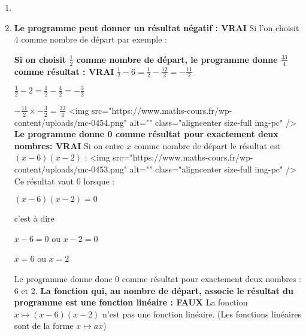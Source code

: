 \begin{corrige}
     \begin{enumerate}
          \item
\begin{center}
\end{center}
          \item
          \textbf{Le programme peut donner un résultat négatif : VRAI}
          Si l'on choisit 4 comme nombre de départ par exemple :
\begin{center}
\end{center}
          \textbf{Si on choisit $\frac{1}{2}$ comme nombre de départ, le programme donne $\frac{33}{4}$ comme résultat : VRAI}
          $\frac{1}{2}-6=\frac{1}{2}-\frac{12}{2}=-\frac{11}{2}$
          \par
          $\frac{1}{2}-2=\frac{1}{2}-\frac{4}{2}=-\frac{3}{2}$
          \par
          $-\frac{11}{2}\times -\frac{3}{2}=\frac{33}{4}$
          <img src="https://www.maths-cours.fr/wp-content/uploads/mc-0454.png" alt="" class="aligncenter size-full  img-pc" />
          \textbf{Le programme donne 0 comme résultat pour exactement deux nombres: VRAI}
          Si on entre $x$ comme nombre de départ le résultat est $\left(x-6\right)\left(x-2\right)$ :
          <img src="https://www.maths-cours.fr/wp-content/uploads/mc-0453.png" alt="" class="aligncenter size-full  img-pc" />
          Ce résultat vaut $0$ lorsque :
          \par
          $\left(x-6\right)\left(x-2\right)=0$
          \par
          c'est à dire
          \par
          $x-6=0$ ou $x-2=0$
          \par
          $x=6$ ou $x=2$
          \par
          Le programme donne  donc 0 comme résultat pour exactement deux nombres : 6 et 2.
          \textbf{La fonction qui, au nombre de départ, associe le résultat du programme est une fonction linéaire : FAUX}
          La fonction $x\mapsto \left(x-6\right)\left(x-2\right)$ n'est pas une fonction linéaire. (Les fonctions linéaires sont de la forme $x\mapsto ax$)
     \end{enumerate}
\end{corrige}
